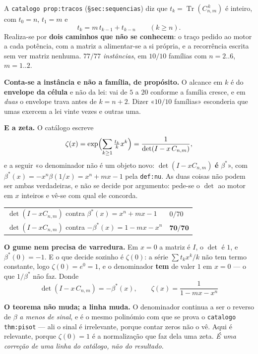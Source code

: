 \documentclass[11pt,a4paper]{article}
\newcommand{\code}[1]{\texttt{\small #1}}
\begin{document}
\noindent A \code{catalogo prop:tracos} (§\code{sec:sequencias}) diz que
$t_k=\operatorname{Tr}(C_{n,m}^{\,k})$ é inteiro, com $t_0=n$, $t_1=m$ e
\[
t_k=m\,t_{k-1}+t_{k-n}\qquad(k\ge n).
\]
Realiza-se por \textbf{dois caminhos que não se conhecem}: o traço pedido ao motor
a cada potência, com a matriz a alimentar-se a si própria, e a recorrência escrita
sem ver matriz nenhuma. \emph{$77/77$ instâncias}, em $10/10$ famílias com
$n=2..6$, $m=1..2$.

\medskip\noindent\textbf{Conta-se a instância e não a família, de propósito.} O
alcance em $k$ é do \textbf{envelope da célula} e não da lei: vai de $5$ a $20$
conforme a família cresce, e em \emph{duas} o envelope trava antes de $k=n+2$.
Dizer «$10/10$ famílias» esconderia que umas exercem a lei vinte vezes e outras uma.

\medskip\noindent\textbf{E a zeta.} O catálogo escreve
\[
\zeta(x)=\exp\Bigl(\sum_{k\ge1}\tfrac{t_k}{k}x^{k}\Bigr)=\frac{1}{\det(I-x\,C_{n,m})},
\]
e a seguir «o denominador não é um objeto novo: $\det(I-xC_{n,m})$ \textbf{é}
$\beta^{*}$», com $\beta^{*}(x)=-x^{n}\beta(1/x)=x^{n}+mx-1$ pela \code{def:nu}. As
duas coisas não podem ser ambas verdadeiras, e não se decide por argumento:
pede-se o $\det$ ao motor em $x$ inteiros e vê-se com qual ele concorda.
\begin{center}
\begin{tabular}{@{}ll@{}}
\toprule
$\det(I-xC_{n,m})$ contra $\beta^{*}(x)=x^{n}+mx-1$ & $0/70$\\
$\det(I-xC_{n,m})$ contra $-\beta^{*}(x)=1-mx-x^{n}$ & $\mathbf{70/70}$\\
\bottomrule
\end{tabular}
\end{center}

\medskip\noindent\textbf{O gume nem precisa de varredura.} Em $x=0$ a matriz é $I$,
o $\det$ é $1$, e $\beta^{*}(0)=-1$. E o que decide sozinho é $\zeta(0)$: a série
$\sum t_kx^k/k$ não tem termo constante, logo $\zeta(0)=e^{0}=1$, e o denominador
\textbf{tem} de valer $1$ em $x=0$ --- o que $1/\beta^{*}$ não faz. Donde
\[
\boxed{\;\det(I-x\,C_{n,m})=-\beta^{*}(x),\qquad
\zeta(x)=\frac{1}{1-mx-x^{n}}\;}
\]

\medskip\noindent\textbf{O teorema não muda; a linha muda.} O denominador continua
a ser o reverso de $\beta$ \emph{a menos de sinal}, e é o mesmo polinómio com que
se prova o \code{catalogo thm:pisot} --- ali o sinal é irrelevante, porque contar
zeros não o vê. Aqui é relevante, porque $\zeta(0)=1$ é a normalização que faz dela
uma zeta. \emph{É uma correção de uma linha do catálogo, não do resultado.}
\end{document}
